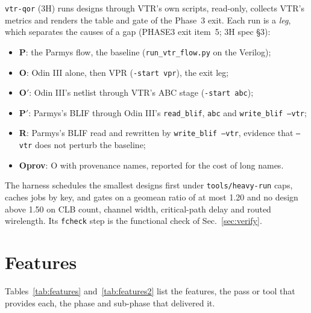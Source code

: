 \documentclass[conference]{IEEEtran}
\newcommand{\code}[1]{\texttt{#1}}
\begin{document}
\code{vtr-qor} (3H) runs designs through VTR's own scripts, read-only, collects VTR's metrics
and renders the table and gate of the Phase~3 exit. Each run is a \emph{leg}, which separates
the causes of a gap (PHASE3 exit item~5; 3H spec \S3):
\begin{itemize}
\item \textbf{P}: the Parmys flow, the baseline (\code{run\_vtr\_flow.py} on the Verilog);
\item \textbf{O}: Odin III alone, then VPR (\code{-start vpr}), the exit leg;
\item \textbf{O$'$}: Odin III's netlist through VTR's ABC stage (\code{-start abc});
\item \textbf{P$'$}: Parmys's BLIF through Odin III's \code{read\_blif}, \code{abc} and
  \code{write\_blif --vtr};
\item \textbf{R}: Parmys's BLIF read and rewritten by \code{write\_blif --vtr}, evidence that
  \code{--vtr} does not perturb the baseline;
\item \textbf{Oprov}: O with provenance names, reported for the cost of long names.
\end{itemize}
The harness schedules the smallest designs first under \code{tools/heavy-run} caps, caches jobs
by key, and gates on a geomean ratio of at most 1.20 and no design above 1.50 on CLB count,
channel width, critical-path delay and routed wirelength. Its \code{fcheck} step is the
functional check of Sec.~\ref{sec:verify}.

\section{Features}
\label{sec:features}

Tables~\ref{tab:features} and~\ref{tab:features2} list the features, the pass or tool that provides each, the phase and
sub-phase that delivered it.
\end{document}
